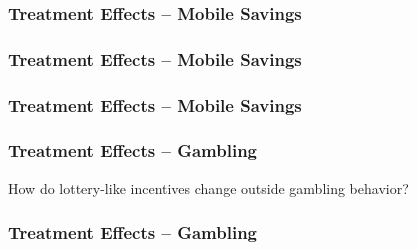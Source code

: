 \documentclass{beamer}
\begin{document}
\begin{frame} \frametitle{Treatment Effects -- Mobile Savings}
	
	\begin{landscape}  \end{landscape}

\end{frame}

\begin{frame} \frametitle{Treatment Effects -- Mobile Savings}
	
	\begin{landscape}  \end{landscape}

\end{frame}

\begin{frame} \frametitle{Treatment Effects -- Mobile Savings}
	
	\begin{landscape}  \end{landscape}

\end{frame}


\begin{frame} \frametitle{Treatment Effects -- Gambling}
	
	How do lottery-like incentives change outside gambling behavior?

\end{frame}

\begin{frame} \frametitle{Treatment Effects -- Gambling}

	\begin{landscape}  \end{landscape}

\end{frame}
\end{document}
